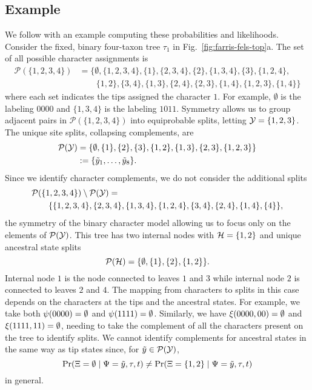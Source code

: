 \subsection*{Example}
We follow with an example computing these probabilities and likelihoods.
Consider the fixed, binary four-taxon tree $\tau_1$ in Fig.~\ref{fig:farris-fels-top}a.
The set of all possible character assignments is
\begin{align*}
\mathcal{P}(\{1,2,3,4\}) &= \{\emptyset, \{1,2,3,4\}, \{1\}, \{2,3,4\}, \{2\}, \{1,3,4\}, \{3\}, \{1,2,4\}, \\
                         &\qquad \{1,2\}, \{3,4\}, \{1,3\}, \{2,4\}, \{2,3\}, \{1,4\}, \{1,2,3\}, \{1,4\}\}
\end{align*}
where each set indicates the tips assigned the character $1$.
For example, $\emptyset$ is the labeling $0000$ and $\{1,3,4\}$ is the labeling $1011$.
Symmetry allows us to group adjacent pairs in $\mathcal{P}(\{1,2,3,4\})$ into equiprobable splits, letting $\mathcal{Y}=\{1,2,3\}$.
The unique site splits, collapsing complements, are
\begin{align*}
    \mathcal{P}(\mathcal{Y}) &= \{\emptyset, \{1\}, \{2\}, \{3\}, \{1,2\}, \{1,3\}, \{2,3\}, \{1,2,3\}\} \\
& := \{\tilde{y}_1, \ldots, \tilde{y}_8\}.
\end{align*}
Since we identify character complements, we do not consider the additional splits
\begin{equation*}
\begin{split}
& \mathcal{P}(\{1,2,3,4\}) \setminus \mathcal{P}(\mathcal{Y}) = \\
&\qquad \{\{1,2,3,4\}, \{2,3,4\}, \{1,3,4\}, \{1,2,4\}, \{3,4\}, \{2,4\}, \{1,4\}, \{4\}\},
\end{split}
\end{equation*}
the symmetry of the binary character model allowing us to focus only on the elements of $\mathcal{P}(\mathcal{Y})$.
This tree has two internal nodes with $\mathcal{H}=\{1,2\}$ and unique ancestral state splits
\[
\mathcal{P}(\mathcal{H}) = \{\emptyset, \{1\}, \{2\}, \{1,2\}\}.
\]
Internal node $1$ is the node connected to leaves $1$ and $3$ while internal node $2$ is connected to leaves $2$ and $4$.
The mapping from characters to splits in this case depends on the characters at the tips and the ancestral states.
For example, we take both $\psi(0000)=\emptyset$ and $\psi(1111)=\emptyset$.
Similarly, we have $\xi(0000, 00) = \emptyset$ and $\xi(1111, 11)=\emptyset$, needing to take the complement of all the characters present on the tree to identify splits.
We cannot identify complements for ancestral states in the same way as tip states since, for $\tilde{y}\in\mathcal{P}(\mathcal{Y})$,
\[
\Pr(\Xi=\emptyset \mid \Psi=\tilde{y}, \tau, t)\neq \Pr(\Xi=\{1,2\} \mid \Psi=\tilde{y}, \tau, t)
\]
in general.


